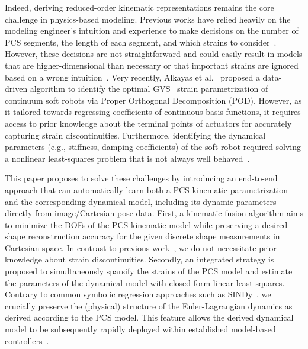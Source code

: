 %
Indeed, deriving reduced-order kinematic representations remains the core challenge in physics-based modeling. 
%
Previous works have relied heavily on the modeling engineer's intuition and experience to make decisions on the number of \gls{PCS} segments, the length of each segment, and which strains to consider~\citep{toshimitsu2021sopra}. However, these decisions are not straightforward and could easily result in models that are higher-dimensional than necessary or that important strains are ignored based on a wrong intuition~\citep{garg2022kinematic}.
Very recently, Alkayas et al.~\citep{alkayas2025soft} proposed a data-driven algorithm to identify the optimal \gls{GVS}~\citep{boyer2020dynamics} strain parametrization of continuum soft robots via Proper Orthogonal Decomposition (POD). However, as it tailored towards regressing coefficients of continuous basis functions, it requires access to prior knowledge about the terminal points of actuators for accurately capturing strain discontinuities.
Furthermore, identifying the dynamical parameters (e.g., stiffness, damping coefficients) of the soft robot required solving a nonlinear least-squares problem that is not always well behaved~\citep{stolzle2024experimental}.

This paper proposes to solve these challenges by introducing an end-to-end approach that can automatically learn both a \gls{PCS} kinematic parametrization and the corresponding dynamical model, including its dynamic parameters directly from image/Cartesian pose data.
First, a kinematic fusion algorithm aims to minimize the \glspl{DOF} of the \gls{PCS} kinematic model while preserving a desired shape reconstruction accuracy for the given discrete shape measurements in Cartesian space. In contrast to previous work~\citep{alkayas2025soft}, we do not necessitate prior knowledge about strain discontinuities.
Secondly, an integrated strategy is proposed to simultaneously sparsify the strains of the \gls{PCS} model and estimate the parameters of the dynamical model with closed-form linear least-squares.
Contrary to common symbolic regression approaches such as SINDy~\citep{kaiser2018sparse}, we crucially preserve the (physical) structure of the Euler-Lagrangian dynamics as derived according to the \gls{PCS} model.
This feature allows the derived dynamical model to be subsequently rapidly deployed within established model-based controllers~\citep{della2023model}.

